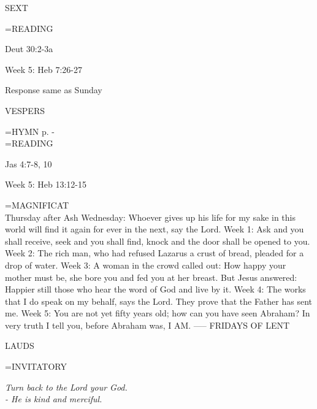 \begin{flushleft}\normalsize SEXT\\\end{flushleft}
\hangindent=\parindent \small READING
\begin{description}[labelindent=\parindent, leftmargin=*]
\item [Thursday after Ash Wednesday \& Weeks 1-4:]     Deut 30:2-3a \textbf{    \\}
\end{description}

Week 5:    Heb 7:26-27    

Response same as Sunday

\begin{flushleft}\normalsize VESPERS\\\end{flushleft}
\hangindent=\parindent \small{\uppercase{HYMN} p. \pageref{lent:firstHymn}-\pageref{lent:lastHymn}\\}
\hangindent=\parindent \small READING
\begin{description}[labelindent=\parindent, leftmargin=*]
\item [Thursday after Ash Wednesday \& Weeks 1-4:]     Jas 4:7-8, 10 \textbf{    \\}
\end{description}

Week 5:    Heb 13:12-15    

\hangindent=\parindent \small{MAGNIFICAT \\}
Thursday after Ash Wednesday:	Whoever gives up his life for my sake in this world will find it again for ever in the next, say the Lord.
Week 1:	Ask and you shall receive, seek and you shall find, knock and the door shall be opened to you.
Week 2:	The rich man, who had refused Lazarus a crust of bread, pleaded for a drop of water.
Week 3:	A woman in the crowd called out: How happy your mother must be, she bore you and fed you at her breast. But Jesus answered: Happier still those who hear the word of God and live by it.
Week 4:	The works that I do speak on my behalf, says the Lord. They prove that the Father has sent me.
Week 5:	You are not yet fifty years old; how can you have seen Abraham? In very truth I tell you, before Abraham was, I AM.
-----
FRIDAYS OF LENT

\begin{flushleft}\normalsize LAUDS\\\end{flushleft}
\hangindent=\parindent \small{INVITATORY}
\begin{center}
\textit{Turn back to the Lord your God.\\}
\textit{- He is kind and merciful.\\}
\end{center}

